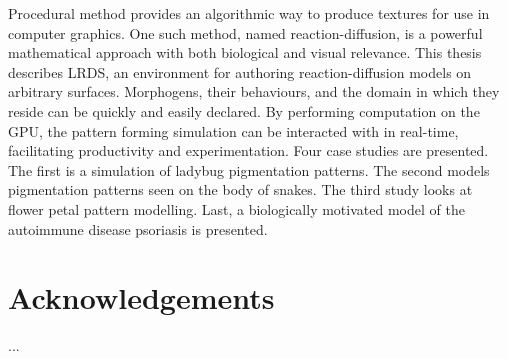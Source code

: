 \documentclass{thesis}
\newcommand{\ProgramName}{LRDS}
\theoremstyle{plain}
\theoremstyle{definition}
\begin{document}

  \begin{thesisabstract}  
Procedural method provides an algorithmic way to produce textures for use in computer graphics. One such method, named reaction-diffusion, is a powerful mathematical approach with both biological and visual relevance. This thesis describes \ProgramName{}, an environment for authoring reaction-diffusion models on arbitrary surfaces. Morphogens, their behaviours, and the domain in which they reside can be quickly and easily declared. By performing computation on the GPU, the pattern forming simulation can be interacted with in real-time, facilitating productivity and experimentation. Four case studies are presented. The first is a simulation of ladybug pigmentation patterns. The second models pigmentation patterns seen on the body of snakes. The third study looks at flower petal pattern modelling. Last, a biologically motivated model of the autoimmune disease psoriasis is presented.
  \end{thesisabstract}


  \chapter{Acknowledgements}  
  ...
    

  
\end{document}
